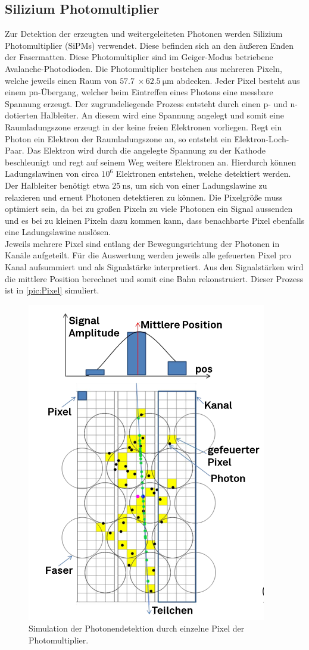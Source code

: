 \subsection{Silizium Photomultiplier}

Zur Detektion der erzeugten und weitergeleiteten Photonen werden Silizium Photomultiplier (SiPMs) verwendet. Diese befinden sich an den äußeren 
Enden der Fasermatten. Diese Photomultiplier sind im Geiger-Modus betriebene Avalanche-Photodioden. Die Photomultiplier bestehen aus mehreren 
Pixeln, welche jeweils einen Raum von $\qty{57.7}{} \times \qty{62.5}{\micro\metre}$ abdecken. Jeder Pixel besteht aus einem pn-Übergang, welcher
beim Eintreffen eines Photons eine messbare Spannung erzeugt. Der zugrundeliegende Prozess entsteht durch einen p- und n-dotierten Halbleiter.
An diesem wird eine Spannung angelegt und somit eine Raumladungszone erzeugt in der keine freien Elektronen vorliegen. Regt ein Photon ein Elektron
der Raumladungszone an, so entsteht ein Elektron-Loch-Paar. Das Elektron wird durch die angelegte Spannung zu der Kathode beschleunigt
und regt auf seinem Weg weitere Elektronen an. Hierdurch können Ladungslawinen von circa $10^6$ Elektronen entstehen, welche detektiert werden.\\
Der Halbleiter benötigt etwa $\qty{25}{\nano\second}$, um sich von einer Ladungslawine zu relaxieren und erneut Photonen detektieren zu können.
Die Pixelgröße muss optimiert sein, da bei zu großen Pixeln zu viele Photonen ein Signal aussenden und es bei zu kleinen Pixeln dazu kommen kann,
dass benachbarte Pixel ebenfalls eine Ladungslawine auslösen.\\
Jeweils mehrere Pixel sind entlang der Bewegungsrichtung der Photonen in Kanäle aufgeteilt. Für die Auswertung werden jeweils alle gefeuerten Pixel
pro Kanal aufsummiert und als Signalstärke interpretiert. Aus den Signalstärken wird die mittlere Position berechnet und somit eine Bahn rekonstruiert.
Dieser Prozess ist in \autoref{pic:Pixel} simuliert. \\

\begin{figure}
    \centering
    \includegraphics[width = .4\textwidth]{content/pics/Pixel_kanal.png}
    \caption{Simulation der Photonendetektion durch einzelne Pixel der Photomultiplier. \cite{SciFi_Versuch}}
    \label{pic:Pixel}
\end{figure}

